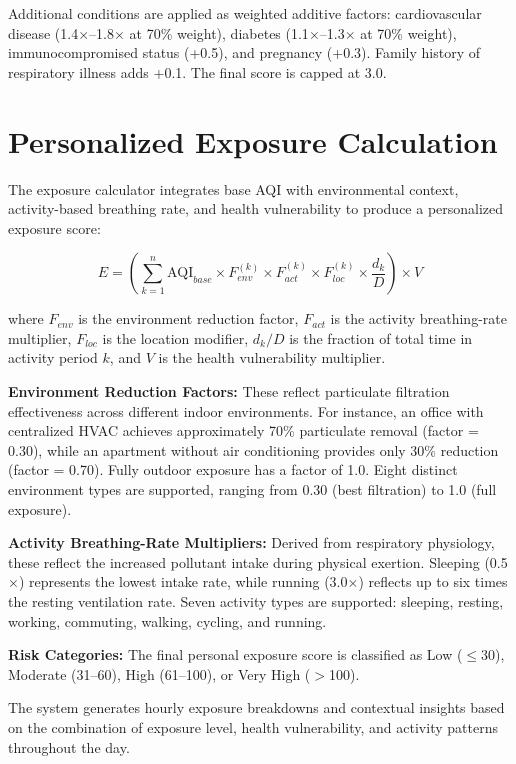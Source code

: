\documentclass[12pt,a4paper]{report}
\begin{document}
Additional conditions are applied as weighted additive factors: cardiovascular disease (1.4$\times$--1.8$\times$ at 70\% weight), diabetes (1.1$\times$--1.3$\times$ at 70\% weight), immunocompromised status (+0.5), and pregnancy (+0.3). Family history of respiratory illness adds +0.1. The final score is capped at 3.0.

\section{Personalized Exposure Calculation}

The exposure calculator integrates base AQI with environmental context, activity-based breathing rate, and health vulnerability to produce a personalized exposure score:

\begin{equation}
  E = \left(\sum_{k=1}^{n} \text{AQI}_{base} \times F_{env}^{(k)} \times F_{act}^{(k)} \times F_{loc}^{(k)} \times \frac{d_k}{D}\right) \times V
  \label{eq:exposure}
\end{equation}

where $F_{env}$ is the environment reduction factor, $F_{act}$ is the activity breathing-rate multiplier, $F_{loc}$ is the location modifier, $d_k/D$ is the fraction of total time in activity period $k$, and $V$ is the health vulnerability multiplier.

\textbf{Environment Reduction Factors:} These reflect particulate filtration effectiveness across different indoor environments. For instance, an office with centralized HVAC achieves approximately 70\% particulate removal (factor = 0.30), while an apartment without air conditioning provides only 30\% reduction (factor = 0.70). Fully outdoor exposure has a factor of 1.0. Eight distinct environment types are supported, ranging from 0.30 (best filtration) to 1.0 (full exposure).

\textbf{Activity Breathing-Rate Multipliers:} Derived from respiratory physiology, these reflect the increased pollutant intake during physical exertion. Sleeping (0.5$\times$) represents the lowest intake rate, while running (3.0$\times$) reflects up to six times the resting ventilation rate. Seven activity types are supported: sleeping, resting, working, commuting, walking, cycling, and running.

\textbf{Risk Categories:} The final personal exposure score is classified as Low ($\leq$30), Moderate (31--60), High (61--100), or Very High ($>$100).

The system generates hourly exposure breakdowns and contextual insights based on the combination of exposure level, health vulnerability, and activity patterns throughout the day.
\end{document}
